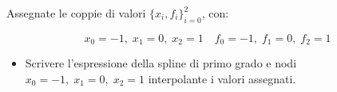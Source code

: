 Assegnate le coppie di valori $\{x_i,f_i \}_{i=0}^2$, con:

\[ x_0=-1, \; x_1=0, \; x_2=1 \quad f_0=-1, \; f_1=0, \; f_2=1 \]

\begin{itemize}
\item Scrivere l'espressione della spline di primo grado e nodi
$x_0=-1, \; x_1=0, \; x_2=1$ interpolante i valori assegnati.

\end{itemize}
